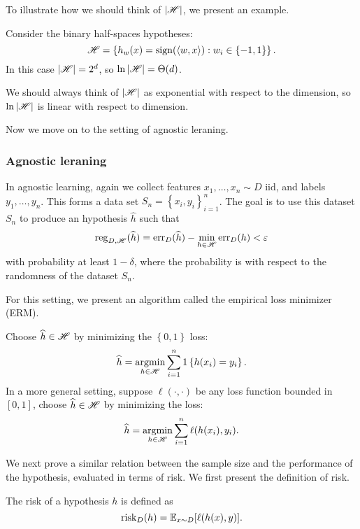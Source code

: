 \documentclass[a4paper]{article}
\begin{document}
To illustrate how we should think of $\left\lvert \mathscr{H}\right\rvert$, 
we present an example.
\begin{eg}
Consider the binary half-spaces hypotheses: 
\[
\mathscr{H} = \left\{ h_w(x) = \operatorname{sign}(\left\langle w, x \right\rangle) : 
w_i \in \left\{ -1, 1 \right\} \right\}.
\]
In this case $\left\lvert \mathscr{H}\right\rvert = 2^d$, so $\ln \left\lvert \mathscr{H}\right\rvert = 
\Theta(d)$. 

We should always think of $\left\lvert \mathscr{H}\right\rvert$
as exponential with respect to the dimension, so 
$\ln \left\lvert \mathscr{H}\right\rvert$ is linear with respect to dimension.
\end{eg}

Now we move on to the setting of agnostic leraning.

\subsubsection*{Agnostic leraning}

In agnostic learning, again we collect features $x_1, \dots,
x_n \sim D$ iid, and labels $y_1, \dots, y_n$. This forms a 
data set $S_n = \left\{ x_i, y_i \right\}_{i=1}^n$. The 
goal is to use this dataset $S_n$ to produce an hypothesis 
$\hat{h}$ such that 
\[
\operatorname{reg}_{D, \mathscr{H}} (\widehat{h}) = 
\operatorname{err}_D (\widehat{h}) - \min_{h \in \mathscr{H}} \operatorname{err}_D (h) < \varepsilon
\]
with probability at least $1 - \delta$, where the probability
is with respect to the randomness of the dataset $S_n$.

For this setting, we present an algorithm called the empirical 
loss minimizer (ERM). 
\begin{algorithm}
  Choose $\widehat{h} \in \mathscr{H}$ by minimizing the $\left\{ 0,1
   \right\}$ loss:
  \[
  \widehat{h} = \operatorname*{argmin}_{h \in \mathscr{H}} \sum_{i=1}^n 1 \left\{ 
    h(x_i) = y_i
   \right\}.
  \]
  In a more general setting, suppose $\ell(\cdot, \cdot)$ 
  be any loss function bounded in $[0, 1]$, choose 
  $\widehat{h} \in \mathscr{H}$ by minimizing the loss:
  \[
  \widehat{h} = \operatorname*{argmin}_{h \in \mathscr{H}} \sum_{i=1}^n \ell(h(x_i), 
  y_i).
  \] 
\end{algorithm}

We next prove a similar relation between the sample 
size and the performance of the hypothesis, evaluated 
in terms of risk. We first present the definition 
of risk.

\begin{defi}[Risk]
  The risk of a hypothesis $h$ is defined as 
  \[
  \operatorname{risk}_D (h) = \mathbb{E}_{x \sim D} [ \ell(h(x), y) ].
  \]
\end{defi}
\end{document}
